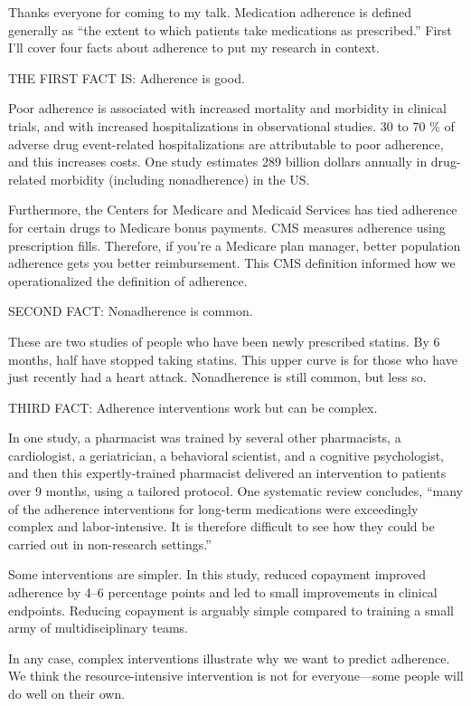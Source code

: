 \documentclass[12pt]{report}
\begin{document}
\begin{large}
Thanks everyone for coming to my talk. Medication adherence is defined
generally as ``the extent to which patients take medications as
prescribed.'' First I'll cover four facts about adherence to put my
research in context. %

THE FIRST FACT IS: Adherence is good. %

Poor adherence is associated with increased mortality and morbidity in
clinical trials, and with increased hospitalizations in observational
studies. 30 to 70 \% of adverse drug event-related hospitalizations
are attributable to poor adherence, and this increases costs. One
study estimates 289 billion dollars annually in drug-related morbidity
(including nonadherence) in the US. %

Furthermore, the Centers for Medicare and Medicaid Services has tied
adherence for certain drugs to Medicare bonus payments. CMS measures
adherence using prescription fills. Therefore, if you're a Medicare
plan manager, better population adherence gets you better
reimbursement. This CMS definition informed how we operationalized the
definition of adherence. %

SECOND FACT: Nonadherence is common. %

These are two studies of people who have been newly prescribed
statins. By 6 months, half have stopped taking statins. This upper
curve is for those who have just recently had a heart attack.
Nonadherence is still common, but less so. %

THIRD FACT: Adherence interventions work but can be complex. %

In one study, a pharmacist was trained by several other pharmacists, a
cardiologist, a geriatrician, a behavioral scientist, and a cognitive
psychologist, and then this expertly-trained pharmacist delivered an
intervention to patients over 9 months, using a tailored protocol. One
systematic review concludes, ``many of the adherence interventions for
long-term medications were exceedingly complex and labor-intensive. It
is therefore difficult to see how they could be carried out in
non-research settings.''

Some interventions are simpler. In this study, reduced copayment
improved adherence by 4--6 percentage points and led to small
improvements in clinical endpoints. Reducing copayment is arguably
simple compared to training a small army of multidisciplinary teams.

In any case, complex interventions illustrate why we want to predict
adherence. We think the resource-intensive intervention is not for
everyone---some people will do well on their own.


\end{large}
\end{document}
